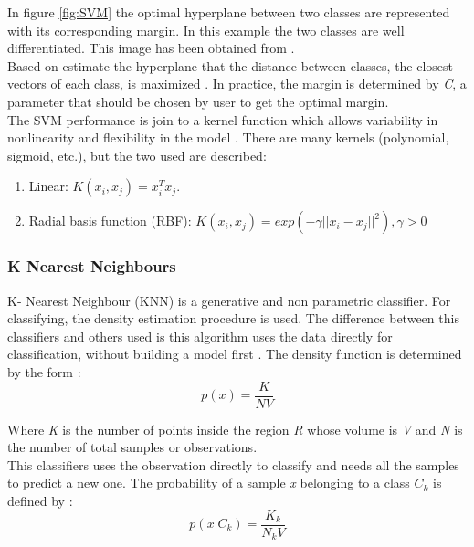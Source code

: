 In figure \ref{fig:SVM} the optimal hyperplane between two classes are represented with its corresponding margin. In this example the two classes are well differentiated. This image has been obtained from \cite{SVMimage}.\\

Based on estimate the hyperplane that the distance between classes, the closest vectors of each class, is maximized \cite{SVM1, MachineLearning}. In practice, the margin is determined by \textit{C}, a parameter that should be chosen by user to get the optimal margin.\\

The SVM performance is join to a kernel function which allows variability in nonlinearity and flexibility in the model \cite{ClassifiersReview, practicalguideSVM}. There are many kernels (polynomial, sigmoid, etc.), but the two used are described:

\begin{enumerate}
\item Linear: $ K(x_{i},x_{j}) = x_i^T x_j$.
\item Radial basis function (RBF): $K(x_{i},x_{j}) = exp(-\gamma||x_i-x_j||^2), \gamma>0$
\end{enumerate}


\subsubsection{K Nearest Neighbours}
K- Nearest Neighbour (KNN) is a generative and non parametric classifier. For classifying, the density estimation procedure is used. The difference between this classifiers and others used is this algorithm uses the data directly for classification, without building a model first \cite{ClassifiersReview}. The density function is determined by the form \cite{MachineLearning}:
\begin{equation}
p(x) = \frac{K}{N V}
\end{equation}

Where \textit{K} is the number of points inside the region \textit{R} whose volume is \textit{V} and \textit{N} is the number of total samples or observations.\\

This classifiers uses the observation directly to classify and needs all the samples to predict a new one. The probability of a sample \textit{x} belonging to a class \textit{$C_k$} is defined by \cite{MachineLearning}:
\begin{equation}
p(x|C_k) = \frac{K_k}{N_k V}
\end{equation}

